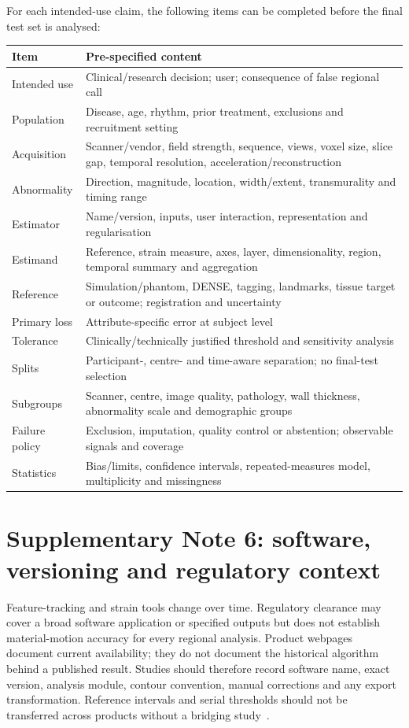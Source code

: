 \documentclass[11pt,a4paper]{article}
\begin{document}
For each intended-use claim, the following items can be completed before the final test set is analysed:

\begin{longtable}{L{0.24\textwidth}L{0.67\textwidth}}
\toprule
Item & Pre-specified content \\
\midrule
Intended use & Clinical/research decision; user; consequence of false regional call \\
Population & Disease, age, rhythm, prior treatment, exclusions and recruitment setting \\
Acquisition & Scanner/vendor, field strength, sequence, views, voxel size, slice gap, temporal resolution, acceleration/reconstruction \\
Abnormality & Direction, magnitude, location, width/extent, transmurality and timing range \\
Estimator & Name/version, inputs, user interaction, representation and regularisation \\
Estimand & Reference, strain measure, axes, layer, dimensionality, region, temporal summary and aggregation \\
Reference & Simulation/phantom, DENSE, tagging, landmarks, tissue target or outcome; registration and uncertainty \\
Primary loss & Attribute-specific error at subject level \\
Tolerance & Clinically/technically justified threshold and sensitivity analysis \\
Splits & Participant-, centre- and time-aware separation; no final-test selection \\
Subgroups & Scanner, centre, image quality, pathology, wall thickness, abnormality scale and demographic groups \\
Failure policy & Exclusion, imputation, quality control or abstention; observable signals and coverage \\
Statistics & Bias/limits, confidence intervals, repeated-measures model, multiplicity and missingness \\
\bottomrule
\end{longtable}

\section*{Supplementary Note 6: software, versioning and regulatory context}

Feature-tracking and strain tools change over time. Regulatory clearance may cover a broad software application or specified outputs but does not establish material-motion accuracy for every regional analysis. Product webpages document current availability; they do not document the historical algorithm behind a published result. Studies should therefore record software name, exact version, analysis module, contour convention, manual corrections and any export transformation. Reference intervals and serial thresholds should not be transferred across products without a bridging study~\cite{lim2021,militaru2021,cao2018}.
\end{document}
